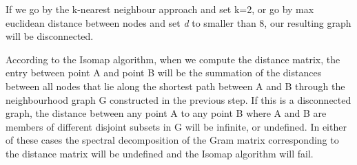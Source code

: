 \documentclass[11pt,a4paper,landscape]{article}
\begin{document}

If we go by the k-nearest neighbour approach and set k=2, or go by max euclidean distance between nodes and set \textit{d} to smaller than 8, our resulting graph will be disconnected.


According to the Isomap algorithm, when we compute the distance matrix, the entry between point A and point B will be the summation of the distances between all nodes that lie along the shortest path between A and B through the neighbourhood graph G constructed in the previous step. If this is a disconnected graph, the distance between any point A to any point B where A and B are members of different disjoint subsets in G will be infinite, or undefined. In either of these cases the spectral decomposition of the Gram matrix corresponding to the distance matrix will be undefined and the Isomap algorithm will fail.

\cite{stackexchange}



\end{document}
